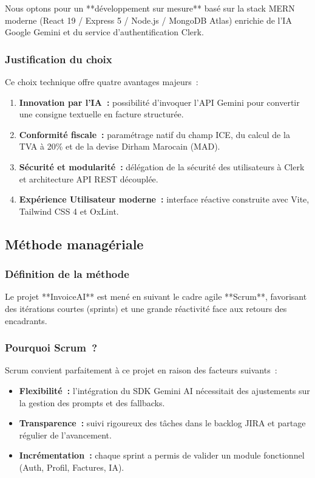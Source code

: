 \documentclass[a4paper,12pt]{extarticle}
\begin{document}
Nous optons pour un **développement sur mesure** basé sur la stack MERN moderne (React 19 / Express 5 / Node.js / MongoDB Atlas) enrichie de l'IA Google Gemini et du service d'authentification Clerk.

\subsubsection{Justification du choix}

Ce choix technique offre quatre avantages majeurs~:
\begin{enumerate}
  \item \textbf{Innovation par l'IA~:} possibilité d'invoquer l'API Gemini pour convertir une consigne textuelle en facture structurée.
  \item \textbf{Conformité fiscale~:} paramétrage natif du champ ICE, du calcul de la TVA à 20\% et de la devise Dirham Marocain (MAD).
  \item \textbf{Sécurité et modularité~:} délégation de la sécurité des utilisateurs à Clerk et architecture API REST découplée.
  \item \textbf{Expérience Utilisateur moderne~:} interface réactive construite avec Vite, Tailwind CSS 4 et OxLint.
\end{enumerate}

\subsection{Méthode managériale}

\subsubsection{Définition de la méthode}

Le projet **InvoiceAI** est mené en suivant le cadre agile **Scrum**, favorisant des itérations courtes (sprints) et une grande réactivité face aux retours des encadrants.

\subsubsection{Pourquoi Scrum~?}

Scrum convient parfaitement à ce projet en raison des facteurs suivants~:
\begin{itemize}
  \item \textbf{Flexibilité~:} l'intégration du SDK Gemini AI nécessitait des ajustements sur la gestion des prompts et des fallbacks.
  \item \textbf{Transparence~:} suivi rigoureux des tâches dans le backlog JIRA et partage régulier de l'avancement.
  \item \textbf{Incrémentation~:} chaque sprint a permis de valider un module fonctionnel (Auth, Profil, Factures, IA).
\end{itemize}
\end{document}
